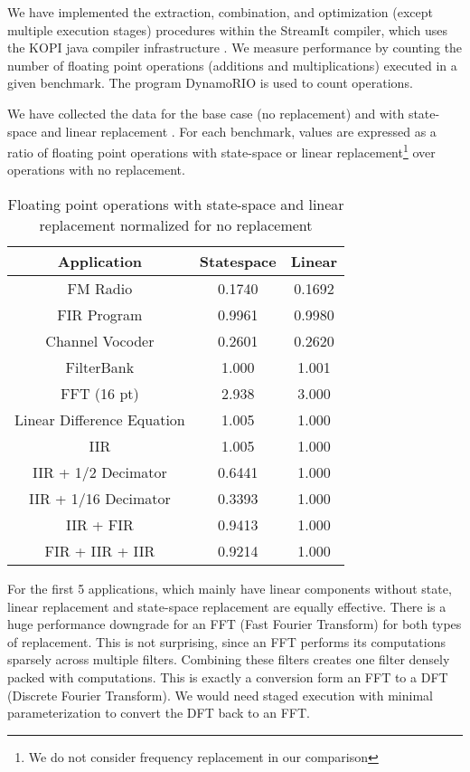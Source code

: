
    We have implemented the extraction, combination, and
optimization (except multiple execution stages) procedures within
the StreamIt compiler, which uses the KOPI java compiler
infrastructure \cite{kopi}. We measure performance by counting the
number of floating point operations (additions and
multiplications) executed in a given benchmark. The program
DynamoRIO \cite{dynamo} is used to count operations.

    We have collected the data for the base case (no replacement) and
with state-space and linear replacement \cite{Lamb}. For each
benchmark, values are expressed as a ratio of floating point
operations with state-space or linear replacement\footnote{We do
not consider frequency replacement in our comparison} over
operations with no replacement.
\begin{table}[tbp]
\begin{center}
\begin{tabular} {c|c|c}
Application & Statespace & Linear \\ \hline
FM Radio & 0.1740 & 0.1692 \\
FIR Program &  0.9961 & 0.9980 \\
Channel Vocoder & 0.2601 & 0.2620 \\
FilterBank & 1.000 & 1.001 \\
FFT (16 pt) & 2.938 & 3.000 \\
Linear Difference Equation & 1.005 & 1.000 \\
IIR & 1.005 & 1.000 \\
IIR + 1/2 Decimator & 0.6441 & 1.000 \\
IIR + 1/16 Decimator & 0.3393 & 1.000 \\
IIR + FIR & 0.9413 & 1.000 \\
FIR + IIR + IIR & 0.9214 & 1.000
\end{tabular}
\caption{Floating point operations with state-space and linear
replacement normalized for no replacement}
\end{center}
\vspace{-12pt}
\end{table}

    For the first 5 applications, which mainly have linear
components without state, linear replacement and state-space
replacement are equally effective. There is a huge performance
downgrade for an FFT (Fast Fourier Transform) for both types of
replacement. This is not surprising, since an FFT performs its
computations sparsely across multiple filters. Combining these
filters creates one filter densely packed with computations. This
is exactly a conversion form an FFT to a DFT (Discrete Fourier
Transform). We would need staged execution with minimal
parameterization to convert the DFT back to an FFT.

